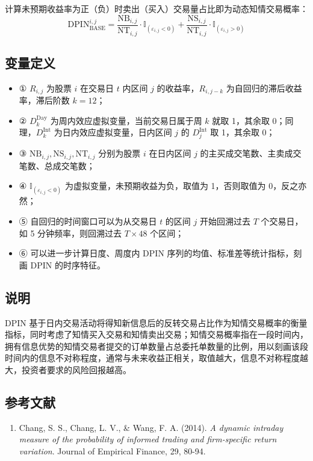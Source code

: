 \documentclass{article}
\begin{document}
计算未预期收益率为正（负）时卖出（买入）交易量占比即为动态知情交易概率：
\begin{equation}
    \mathrm{DPIN}_{\mathrm{BASE}}^{i,j} = \frac{\mathrm{NB}_{i,j}}{\mathrm{NT}_{i,j}} \cdot \mathbb{I}_{(\varepsilon_{i,j} < 0)} + \frac{\mathrm{NS}_{i,j}}{\mathrm{NT}_{i,j}} \cdot \mathbb{I}_{(\varepsilon_{i,j} > 0)}
\end{equation}

\subsection{变量定义}
\begin{itemize}
    \item ① \( R_{i,j} \) 为股票 \( i \) 在交易日 \( t \) 内区间 \( j \) 的收益率，\( R_{i,j-k} \) 为自回归的滞后收益率，滞后阶数 \( k=12 \)；
    \item ② \( D_k^{\mathrm{Day}} \) 为周内效应虚拟变量，当前交易日属于周 \( k \) 就取 1，其余取 0；同理，\( D_k^{\mathrm{Int}} \) 为日内效应虚拟变量，日内区间 \( j \) 的 \( D_j^{\mathrm{Int}} \) 取 1，其余取 0；
    \item ③ \( \mathrm{NB}_{i,j}, \mathrm{NS}_{i,j}, \mathrm{NT}_{i,j} \) 分别为股票 \( i \) 在日内区间 \( j \) 的主买成交笔数、主卖成交笔数、总成交笔数；
    \item ④ \( \mathbb{I}_{(\varepsilon_{i,j} < 0)} \) 为虚拟变量，未预期收益为负，取值为 1，否则取值为 0，反之亦然；
    \item ⑤ 自回归的时间窗口可以为从交易日 \( t \) 的区间 \( j \) 开始回溯过去 \( T \) 个交易日，如 5 分钟频率，则回溯过去 \( T \times 48 \) 个区间；
    \item ⑥ 可以进一步计算日度、周度内 DPIN 序列的均值、标准差等统计指标，刻画 DPIN 的时序特征。
\end{itemize}

\subsection{说明}
DPIN 基于日内交易活动将得知新信息后的反转交易占比作为知情交易概率的衡量指标，同时考虑了知情买入交易和知情卖出交易；知情交易概率指在一段时间内，拥有信息优势的知情交易者提交的订单数量占总委托单数量的比例，用以刻画该段时间内的信息不对称程度，通常与未来收益正相关，取值越大，信息不对称程度越大，投资者要求的风险回报越高。

\subsection{参考文献}
\begin{enumerate}
    \item Chang, S. S., Chang, L. V., \& Wang, F. A. (2014). \textit{A dynamic intraday measure of the probability of informed trading and firm-specific return variation}. Journal of Empirical Finance, 29, 80-94.
\end{enumerate}
\end{document}
